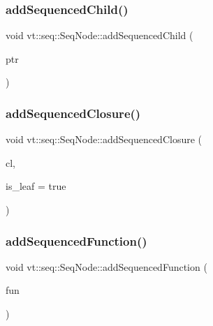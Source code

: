 \mbox{\label{structvt_1_1seq_1_1_seq_node_a7554b8cdfe9a983d937554979505b76e}} 
\subsubsection{\texorpdfstring{add\+Sequenced\+Child()}{addSequencedChild()}}
{\footnotesize\ttfamily void vt\+::seq\+::\+Seq\+Node\+::add\+Sequenced\+Child (\begin{DoxyParamCaption}\item[{\hyperlink{namespacevt_1_1seq_ae6a4874b585be0612aaca32ca6d2d191}{Seq\+Node\+Ptr\+Type}}]{ptr }\end{DoxyParamCaption})}

\mbox{\label{structvt_1_1seq_1_1_seq_node_a374eeb2288505547195a5a4d97ba5dbf}} 
\subsubsection{\texorpdfstring{add\+Sequenced\+Closure()}{addSequencedClosure()}}
{\footnotesize\ttfamily void vt\+::seq\+::\+Seq\+Node\+::add\+Sequenced\+Closure (\begin{DoxyParamCaption}\item[{\hyperlink{namespacevt_1_1seq_a13c76fb1c62795dfd2d359b2dde35e8a}{Seq\+Leaf\+Closure\+Type}}]{cl,  }\item[{bool const \&}]{is\+\_\+leaf = {\ttfamily true} }\end{DoxyParamCaption})}

\mbox{\label{structvt_1_1seq_1_1_seq_node_aa1d4558f9d457a5368c0ea651efc806e}} 
\subsubsection{\texorpdfstring{add\+Sequenced\+Function()}{addSequencedFunction()}}
{\footnotesize\ttfamily void vt\+::seq\+::\+Seq\+Node\+::add\+Sequenced\+Function (\begin{DoxyParamCaption}\item[{\hyperlink{namespacevt_1_1seq_ab345c700c06d135cafba39f711767ad5}{Seq\+Expand\+Fun\+Type}}]{fun }\end{DoxyParamCaption})}


